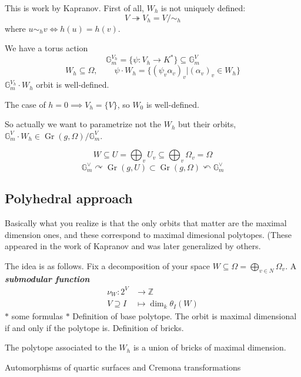 This is work by Kapranov. First of all, $W_h$ is not uniquely defined:
\[V\twoheadrightarrow V_h=V/\sim_h\]
where $u\sim_h v\iff h(u)=h(v)$.

We have a torus action
\[\mathbb{G}^{V_h}_m=\{\psi:V_h\longrightarrow K^*\} \subseteq \mathbb{G}^V_m\]
\[W_h\subseteq \Omega,\qquad \psi\cdot W_h=\{(\psi_v\alpha_v)_v|(\alpha_v)_v\in W_h\}\]
$\mathbb{G}^{V_h}_m\cdot W_h$ orbit is well-defined.

The case of $h=0\implies V_h=\{V\}$, so $W_0$ is well-defined.

So actually we want to parametrize not the $W_h$ but their orbits, $\mathbb{G}^V_m\cdot W_h\in \operatorname{Gr}(g,\Omega)/\mathbb{G}^V_m$.

\[W\subseteq U=\bigoplus_{v} U_v\subseteq \bigoplus_{v} \Omega_v=\Omega \]
\[\mathbb{G}^\vee_m\curvearrowright\operatorname{Gr}(g,U)\subset \operatorname{Gr}(g,\Omega)\curvearrowleft \mathbb{G}^\vee_m\]

\subsection{Polyhedral approach}
Basically what you realize is that the only orbits that matter are the maximal dimension ones, and these correspond to maximal dimesional polytopes. (These appeared in the work of Kapranov and was later generalized by others.

The idea is as follows. Fix a decomposition of your space $W\subseteq \Omega=\bigoplus_{v\in N} \Omega_v $. A \textit{\textbf{submodular function}}
\begin{align*}
	\nu_W: 2^V &\longrightarrow \mathbb{Z} \\
	V\supseteq I &\longmapsto \dim_k\theta_I(W)
\end{align*}
$*$ some formulas $*$ Definition of base polytope. The orbit is maximal dimensional if and only if the polytope is. Definition of bricks.

\begin{thm}\leavevmode
	The polytope associated to the $W_h$ is a union of bricks of maximal dimension.
\end{thm}

\clearpage
{}
{\Huge Automorphisms of quartic surfaces and Cremona transformations}

